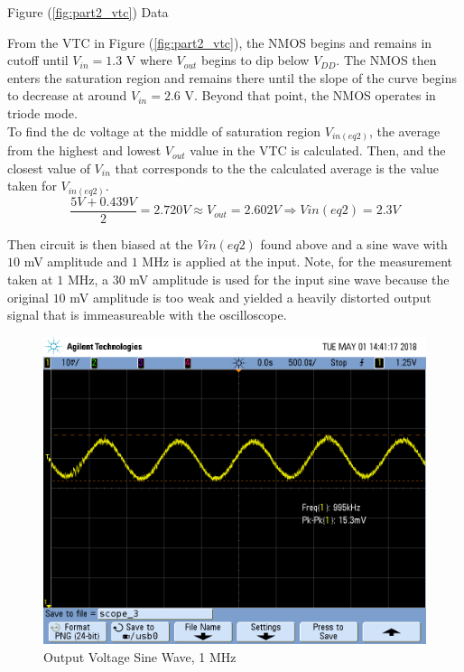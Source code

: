 \FloatBarrier

\begin{table}[h!]
	\centering
	\caption{Figure (\ref{fig:part2_vtc}) Data}
	\label{tab:part2_vtc}
\end{table}

\FloatBarrier

From the VTC in Figure (\ref{fig:part2_vtc}), the NMOS begins and remains in cutoff until $V_{in} = 1.3$ \si{\volt} where $V_{out}$ begins to dip below $V_{DD}$.
The NMOS then enters the saturation region and remains there until the slope of the curve begins to decrease at around $V_{in} = 2.6$ \si{\volt}.
Beyond that point, the NMOS operates in triode mode. \\

To find the dc voltage at the middle of saturation region $V_{in(eq2)}$, the average from the highest and lowest $V_{out}$ value in the VTC is calculated.
Then, and the closest value of $V_{in}$ that corresponds to the the calculated average is the value taken for $V_{in(eq2)}$. \\

\begin{equation}
	\label{eq:v_in_eq2}
	\frac{5 V + 0.439 V}{2} = 2.720 V \approx V_{out} = 2.602 V \Rightarrow V{in(eq2)} = 2.3 V
\end{equation}

Then circuit is then biased at the $V{in(eq2)}$ found above and a sine wave with $10$ \si{\milli\volt} amplitude and $1$ \si{\mega\hertz} is applied at the input. Note, for the measurement taken at $1$ \si{\mega\hertz}, a $30$ \si{\milli\volt} amplitude is used for the input sine wave because the original $10$ \si{\milli\volt} amplitude is too weak and yielded a heavily distorted output signal that is immeasureable with the oscilloscope.

\FloatBarrier

\begin{figure}[h!]
	\centering
	\includegraphics[scale=0.3]{../images/SCOPE_3.PNG}
	\caption{Output Voltage Sine Wave, 1 \si{\mega\hertz}}
	\label{fig:1mhz_original}
\end{figure}

